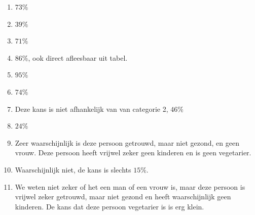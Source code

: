 \documentclass[a4paper,10pt,fleqn]{article}
\begin{document}
\begin{enumerate}[1.]
    \item $73\%$

    \item $39\%$

    \item $71\%$

    \item $86\%$, ook direct afleesbaar uit tabel.

    \item $95\%$

    \item $74\%$

    \item Deze kans is niet afhankelijk van van categorie 2, $46\%$

    \item $24\%$

    \item Zeer waarschijnlijk is deze persoon getrouwd, maar niet gezond, en geen vrouw. Deze persoon heeft vrijwel zeker geen kinderen en is geen vegetarier.

    \item Waarschijnlijk niet, de kans is slechts $15\%$.

    \item We weten niet zeker of het een man of een vrouw is, maar deze persoon is vrijwel zeker getrouwd, maar niet gezond en heeft waarschijnlijk geen kinderen. De kans dat deze persoon vegetarier is is erg klein.
\end{enumerate}
\end{document}

